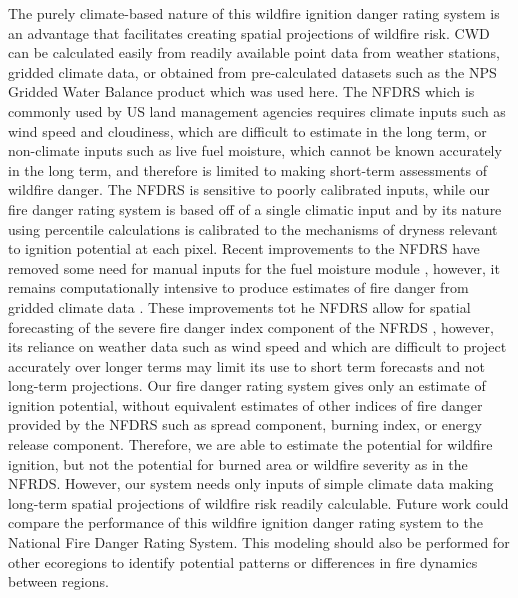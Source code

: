 \documentclass[11p]{article}
\begin{document}
\begin{table}
{%

The purely climate-based nature of this wildfire ignition danger rating system is an advantage that facilitates creating spatial projections of wildfire risk. CWD can be calculated easily from readily available point data from weather stations, gridded climate data, or obtained from pre-calculated datasets such as the NPS Gridded Water Balance product \citep{tercekHistoricalChangesPlant2021} which was used here. The NFDRS \citep{degrootChapter11Wildland2015} which is commonly used by US land management agencies requires climate inputs such as wind speed and cloudiness, which are difficult to estimate in the long term, or non-climate inputs such as live fuel moisture, which cannot be known accurately in the long term, and therefore is limited to making short-term assessments of wildfire danger. The NFDRS is sensitive to poorly calibrated inputs, while our fire danger rating system is based off of a single climatic input and by its nature using percentile calculations is calibrated to the mechanisms of dryness relevant to ignition potential at each pixel. Recent improvements to the NFDRS have removed some need for manual inputs for the fuel moisture module \citep{jollyModernizingUSNational2024}, however, it remains computationally intensive to produce estimates of fire danger from gridded climate data \citep{farguellFastSpatialNFDRS2025a}. These improvements tot he NFDRS allow for spatial forecasting of the severe fire danger index component of the NFRDS \citep{jollySevereFireDanger2019}, however, its reliance on weather data such as wind speed and which are difficult to project accurately over longer terms may limit its use to short term forecasts and not long-term projections. Our fire danger rating system gives only an estimate of ignition potential, without equivalent estimates of other indices of fire danger provided by the NFDRS such as spread component, burning index, or energy release component. Therefore, we are able to estimate the potential for wildfire ignition, but not the potential for burned area or wildfire severity as in the NFRDS. However, our system needs only inputs of simple climate data making long-term spatial projections of wildfire risk readily calculable. Future work could compare the performance of this wildfire ignition danger rating system to the National Fire Danger Rating System. This modeling should also be performed for other ecoregions to identify potential patterns or differences in fire dynamics between regions. 


}
\end{table}
\end{document}
